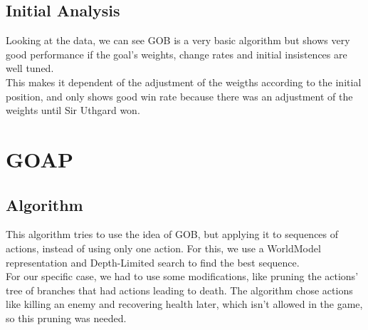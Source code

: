\documentclass{article}
\begin{document}
  \subsection{Initial Analysis}
  Looking at the data, we can see GOB is a very basic algorithm but shows very good performance if the goal's weights, change rates and initial insistences are well tuned.\\
  This makes it dependent of the adjustment of the weigths according to the initial position, and only shows good win rate because there was an adjustment of the weights
  until Sir Uthgard won. 
  \section{GOAP}
  \subsection{Algorithm}
  This algorithm tries to use the idea of GOB, but applying it to sequences of actions, instead of using only one action. For this, we use a WorldModel representation 
  and Depth-Limited search to find the best sequence.\\
  For our specific case, we had to use some modifications, like pruning the actions' tree of branches that had actions leading to death. The algorithm chose actions like killing
  an enemy and recovering health later, which isn't allowed in the game, so this pruning was needed.
\end{document}
